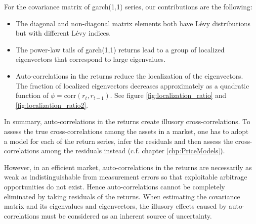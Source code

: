 For the covariance matrix of \gls{garch}(1,1) series, our
contributions are the following:
\begin{itemize}
\item The diagonal and non-diagonal matrix elements both have L\'evy
  distributions but with different L\'evy indices.
\item The power-law tails of \gls{garch}(1,1) returns lead to a group
  of localized eigenvectors that correspond to large eigenvalues.
\item Auto-correlations in the returns reduce the localization of the
  eigenvectors. The fraction of localized eigenvectors decreases
  approximately as a quadratic function of $\phi = \text{corr}(r_t,
  r_{t-1})$. See figure \ref{fig:localization_ratio} and
  \ref{fig:localization_ratio2}.
\end{itemize}

In summary, auto-correlations in the returns create illusory
cross-correlations. To assess the true cross-correlations among the
assets in a market, one has to adopt a model for each of the return
series, infer the residuals and then assess the cross-correlations
among the residuals instead (c.f. chapter \ref{chp:PriceModels}).

However, in an efficient market, auto-correlations in the returns are
necessarily as weak as indistinguishable from measurement errors 
so that exploitable arbitrage opportunities do not exist. Hence
auto-correlations cannot be completely eliminated by taking residuals
of the returns. When estimating the covariance matrix and its
eigenvalues and eigenvectors, the illusory effects caused by
auto-correlations must be considered as an inherent source of
uncertainty.


